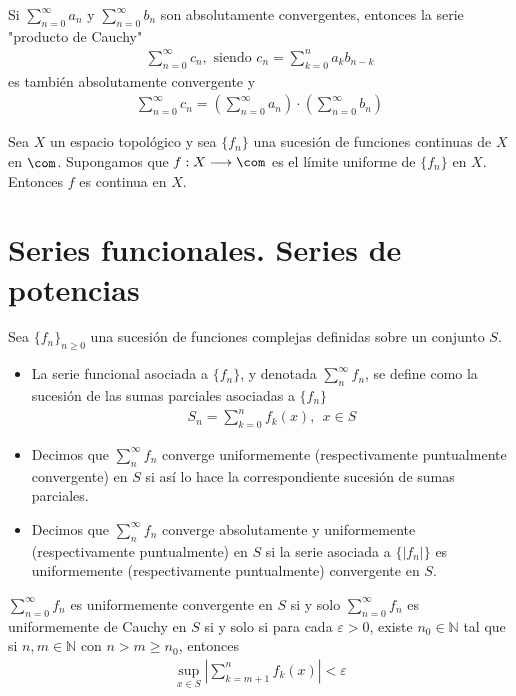 \begin{prop}
Si $\sum_{n=0}^{\infty}{a_n}$ y $\sum_{n=0}^{\infty}{b_n}$ son absolutamente convergentes, entonces la serie "producto de Cauchy" 
\begin{align*}
    \sum_{n=0}^{\infty}{c_n}, \text{ siendo } c_n = \sum_{k=0}^{n}{a_kb_{n-k}}
\end{align*}
es también absolutamente convergente y
\begin{align*}
    \sum_{n=0}^{\infty}{c_n} = \left( \sum_{n=0}^{\infty}{a_n}\right) \cdot \left( \sum_{n=0}^{\infty}{b_n}\right)
\end{align*}
\end{prop}

\begin{prop}
Sea $X$ un espacio topológico y sea $\{f_n\}$ una sucesión de funciones continuas de $X$ en $\com$. Supongamos que $f: X \longrightarrow \com$ es el límite uniforme de $\{f_n\}$ en $X$. Entonces $f$ es continua en $X$. 
\end{prop}

\section{Series funcionales. Series de potencias}

\begin{defi}
Sea $\{f_n\}_{n \ge 0}$ una sucesión de funciones complejas definidas sobre un conjunto $S$.
\begin{itemize}
    \item La serie funcional asociada a $\{f_n\}$, y denotada $\sum_{n}^{\infty}{f_n}$, se define como la sucesión de las sumas parciales asociadas a $\{f_n\}$
    \begin{align*}
        S_n = \sum_{k=0}^{n}{f_k(x)}, \ \ x \in S
    \end{align*}
    \item Decimos que $\sum_{n}^{\infty}{f_n}$ converge uniformemente (respectivamente puntualmente convergente) en $S$ si así lo hace la correspondiente sucesión de sumas parciales.
    \item Decimos que $\sum_{n}^{\infty}{f_n}$ converge absolutamente y uniformemente (respectivamente puntualmente) en $S$ si la serie asociada a $\{|f_n|\}$ es uniformemente (respectivamente puntualmente) convergente en $S$.
\end{itemize}
\end{defi}

\begin{teo}
$\sum_{n=0}^{\infty}{f_n}$ es uniformemente convergente en $S$ si y solo $\sum_{n=0}^{\infty}{f_n}$ es uniformemente de Cauchy en $S$ si y solo si para cada $\varepsilon > 0$, existe $n_0 \in \mathbb{N}$ tal que si $n,m \in \mathbb{N}$ con $n > m \ge n_0$, entonces
\begin{align*}
    \sup_{x \in S}{\left| \sum_{k=m+1}^{n}{f_k(x)}\right|} < \varepsilon
\end{align*}
\end{teo}

